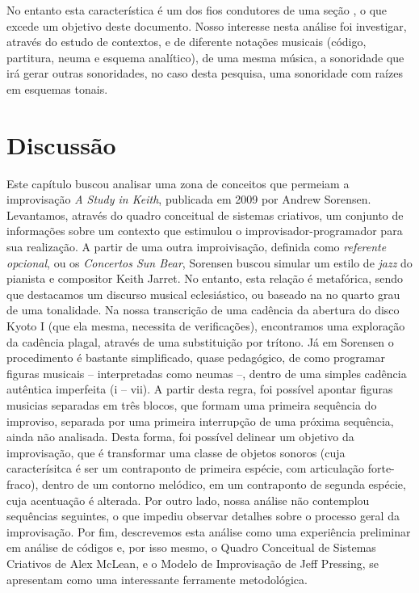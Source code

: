 No entanto esta característica é um dos fios condutores de uma seção , o que excede um objetivo deste documento. Nosso interesse nesta análise foi investigar, através do estudo de contextos, e de diferente notações musicais (código, partitura, neuma e esquema analítico), de uma mesma música, a sonoridade que irá gerar outras sonoridades, no caso desta pesquisa, uma sonoridade com raízes em esquemas tonais.

\section{Discussão}

Este capítulo buscou analisar uma zona de conceitos que permeiam a improvisação \emph{A Study in Keith}, publicada em 2009 por Andrew Sorensen. Levantamos, através do quadro conceitual de sistemas criativos, um conjunto de informações sobre um contexto que estimulou o improvisador-programador para sua realização. A partir de uma outra improivisação,  definida como \emph{referente opcional}, ou os \emph{Concertos Sun Bear}, Sorensen buscou simular um estilo de \emph{jazz} do pianista e compositor Keith Jarret. No entanto, esta relação é metafórica, sendo que destacamos um discurso musical eclesiástico, ou baseado na no quarto grau de uma tonalidade. Na nossa transcrição de uma cadência da abertura do disco Kyoto I (que ela mesma, necessita de verificações), encontramos uma exploração da cadência plagal, através de uma substituição por trítono. Já em Sorensen o procedimento é bastante simplificado, quase pedagógico, de como programar figuras musicais -- interpretadas como neumas --, dentro de uma simples cadência autêntica imperfeita (i -- vii). A partir desta regra, foi possível apontar figuras musicias separadas em três blocos, que formam uma primeira sequência do improviso, separada por uma primeira interrupção de uma próxima sequência, ainda não analisada. Desta forma, foi possível delinear um objetivo da improvisação, que é transformar uma classe de objetos sonoros (cuja caracterísitca é ser um contraponto de primeira espécie, com articulação forte-fraco), dentro de um contorno melódico, em um contraponto de segunda espécie, cuja acentuação é alterada. Por outro lado, nossa análise não contemplou sequências seguintes, o que impediu observar detalhes sobre o processo geral da improvisação. Por fim, descrevemos esta análise como uma experiência preliminar em análise de códigos e, por isso mesmo, o Quadro Conceitual de Sistemas Criativos de Alex McLean, e o Modelo de Improvisação de Jeff Pressing, se apresentam como uma interessante ferramente metodológica. 